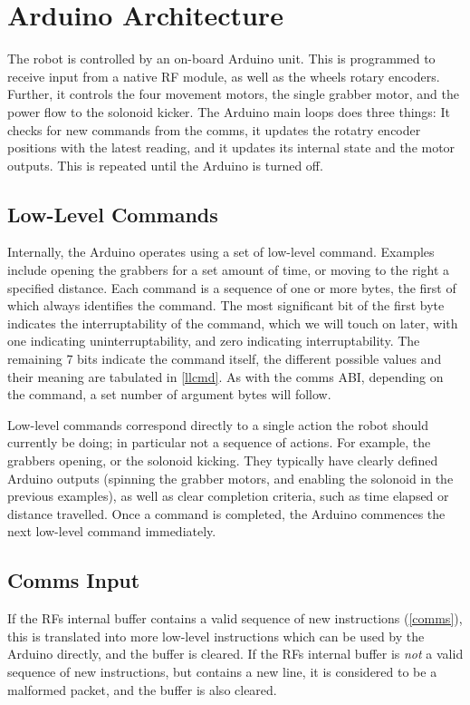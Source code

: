 \section{Arduino Architecture}

The robot is controlled by an on-board Arduino unit. This is programmed to
receive input from a native RF module, as well as the wheels rotary encoders.
Further, it controls the four movement motors, the single grabber motor, and
the power flow to the solonoid kicker. The Arduino main loops does three
things: It checks for new commands from the comms, it updates the rotatry
encoder positions with the latest reading, and it updates its internal state
and the motor outputs. This is repeated until the Arduino is turned off.

\subsection{Low-Level Commands}

Internally, the Arduino operates using a set of low-level command. Examples
include opening the grabbers for a set amount of time, or moving to the right a
specified distance. Each command is a sequence of one or more bytes, the first
of which always identifies the command. The most significant bit of the first
byte indicates the interruptability of the command, which we will touch on
later, with one indicating uninterruptability, and zero indicating
interruptability. The remaining 7 bits indicate the command itself, the
different possible values and their meaning are tabulated in \cref{llcmd}. As
with the comms ABI, depending on the command, a set number of argument bytes
will follow.

Low-level commands correspond directly to a single action the robot should
currently be doing; in particular not a sequence of actions. For example, the
grabbers opening, or the solonoid kicking. They typically have clearly defined
Arduino outputs (spinning the grabber motors, and enabling the solonoid in the
previous examples), as well as clear completion criteria, such as time elapsed
or distance travelled. Once a command is completed, the Arduino commences the
next low-level command immediately.

\subsection{Comms Input}

If the RFs internal buffer contains a valid sequence of new instructions
(\cref{comms}), this is translated into more low-level instructions which can
be used by the Arduino directly, and the buffer is cleared. If the RFs internal
buffer is \textit{not} a valid sequence of new instructions, but contains a new
line, it is considered to be a malformed packet, and the buffer is also
cleared.

